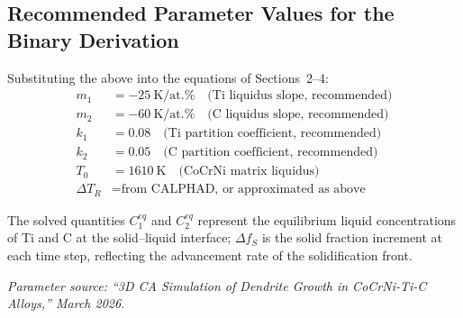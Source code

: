 \documentclass[12pt, a4paper]{article}
\begin{document}
\subsection{Recommended Parameter Values for the Binary Derivation}

Substituting the above into the equations of Sections~2--4:
\begin{align*}
  m_1 &= -25\ \text{K/at.\%} \quad \text{(Ti liquidus slope, recommended)} \\
  m_2 &= -60\ \text{K/at.\%} \quad \text{(C liquidus slope, recommended)} \\
  k_1 &= 0.08 \quad \text{(Ti partition coefficient, recommended)} \\
  k_2 &= 0.05 \quad \text{(C partition coefficient, recommended)} \\
  T_0 &= 1610\ \text{K} \quad \text{(CoCrNi matrix liquidus)} \\
  \Delta T_R &= \text{from CALPHAD, or approximated as above}
\end{align*}

The solved quantities $C_1^{eq}$ and $C_2^{eq}$ represent the equilibrium liquid concentrations
of Ti and C at the solid--liquid interface; $\Delta f_S$ is the solid fraction increment
at each time step, reflecting the advancement rate of the solidification front.

\bigskip
\noindent\textit{Parameter source: ``3D CA Simulation of Dendrite Growth in CoCrNi-Ti-C Alloys,'' March 2026.}

\end{document}
